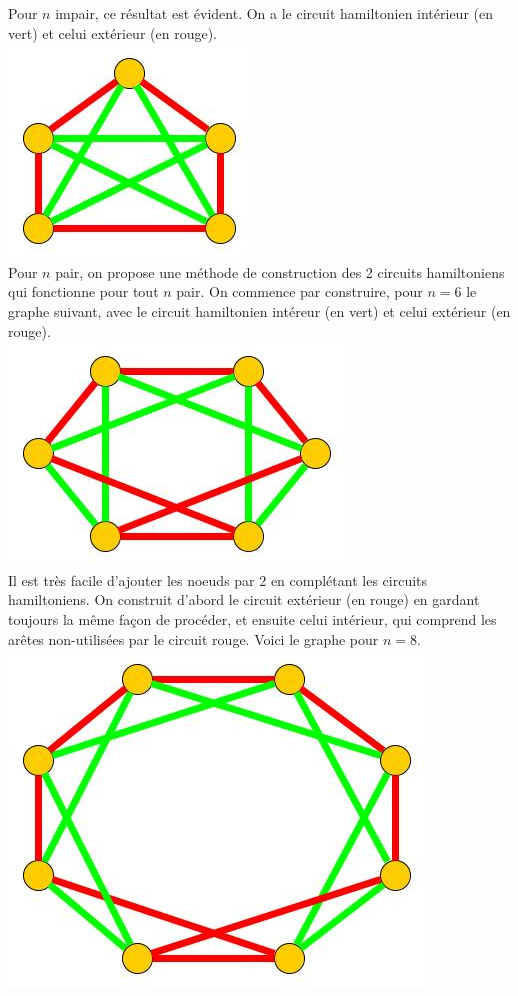 \begin{solution}
Pour $n$ impair, ce résultat est évident. On a le circuit hamiltonien intérieur (en vert) et celui extérieur (en rouge).\\
\includegraphics[scale=0.5]{nimpair.jpg}
\\
Pour $n$ pair, on propose une méthode de construction des 2 circuits hamiltoniens qui fonctionne pour tout $n$ pair. On commence par construire, pour $n=6$ le graphe suivant, avec le circuit hamiltonien intéreur (en vert) et celui extérieur (en rouge).
\\
\includegraphics[scale=0.5]{npair1.jpg}
\\
Il est très facile d'ajouter les noeuds par 2 en complétant les circuits hamiltoniens. On construit d'abord le circuit extérieur (en rouge) en gardant toujours la même façon de procéder, et ensuite celui intérieur, qui comprend les arêtes non-utilisées par le circuit rouge. Voici le graphe pour $n=8$.
\\
\includegraphics[scale=0.5]{npair2.jpg}
\\
\end{solution}

